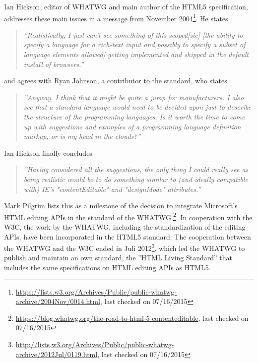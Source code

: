 
Ian Hickson, editor of WHATWG and main author of the HTML5 specification, addresses these main issues in a message from November 2004\footnote{\url{https://lists.w3.org/Archives/Public/public-whatwg-archive/2004Nov/0014.html}, last checked on 07/16/2015}. He states

\begin{quotation}
\textit{''Realistically, I just can't see something of this scoped[sic] [the ability to specify a language for a rich-text input and possibly to specify a subset of language elements allowed] getting implemented and shipped in the default install of browsers.''}
\end{quotation}

and agrees with Ryan Johnson, a contributor to the standard, who states

\begin{quotation}
\textit{''Anyway, I think that it might be quite a jump for manufacturers. I also see that a standard language would need to be decided upon just to describe the structure of the programming languages. Is it worth the time to come up with suggestions and examples of a programming language definition markup, or is my head in the clouds?''}
\end{quotation}

Ian Hickson finally concludes

\begin{quotation}
\textit{''Having considered all the suggestions, the only thing I could really see 
as being realistic would be to do something similar to (and ideally 
compatible with) IE's "contentEditable" and "designMode" attributes.''}
\end{quotation}

Mark Pilgrim lists this as a milestone of the decision to integrate Microsoft's HTML editing APIs in the standard of the WHATWG.\footnote{\url{https://blog.whatwg.org/the-road-to-html-5-contenteditable}, last checked on 07/16/2015}. In cooperation with the W3C, the work by the WHATWG, including the standardization of the editing APIs, have been incorporated in the HTML5 standard. The cooperation between the WHATWG and the W3C ended in Juli 2012\footnote{\url{http://lists.w3.org/Archives/Public/public-whatwg-archive/2012Jul/0119.html}, last checked on 07/16/2015}, which led the WHATWG to publish and maintain an own standard, the ''HTML Living Standard''\cite{HTMLWHATWG} that includes the same specifications on HTML editing APIs as HTML5.




